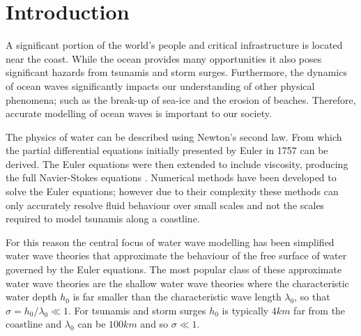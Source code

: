 \chapter{Introduction}
\label{chp:Introduction}

A significant portion of the world's people and critical infrastructure is located near the coast. While the ocean provides many opportunities it also poses significant hazards from tsunamis and storm surges. Furthermore, the dynamics of ocean waves significantly impacts our understanding of other physical phenomena; such as the break-up of sea-ice and the erosion of beaches. Therefore, accurate modelling of ocean waves is important to our society. 

The physics of water can be described using Newton's second law. From which the partial differential equations initially presented by Euler in 1757 \cite{Euler-1755-274} can be derived. The Euler equations were then extended to include viscosity, producing the full Navier-Stokes equations \cite{navier1823,stokes1845gg}. Numerical methods \cite{Chorin-1967-928,Taylor-Hood-1973-73,Bassi-1997-267} have been developed to solve the Euler equations; however due to their complexity these methods can only accurately resolve fluid behaviour over small scales and not the scales required to model tsunamis along a coastline. 

For this reason the central focus of water wave modelling has been simplified water wave theories that approximate the behaviour of the free surface of water governed by the Euler equations. The most popular class of these approximate water wave theories are the shallow water wave theories where the characteristic water depth $h_0$ is far smaller than the characteristic wave length $\lambda_0$, so that $\sigma = h_0 / \lambda_0 \ll 1$. For tsunamis and storm surges $h_0$ is typically $4km$ far from the coastline and $\lambda_0$ can be $100km$ and so $\sigma\ll 1$.

